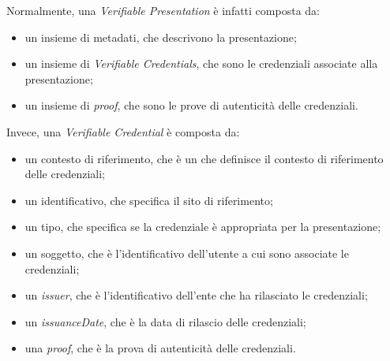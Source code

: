 Normalmente, una \textit{Verifiable Presentation} è infatti composta da:
\begin{itemize}
    \item un insieme di metadati, che descrivono la presentazione;
    \item un insieme di \textit{Verifiable Credentials}, che sono le credenziali associate alla presentazione;
    \item un insieme di \textit{proof}, che sono le prove di autenticità delle credenziali.
\end{itemize}

Invece, una \textit{Verifiable Credential} è composta da:
\begin{itemize}
    \item un contesto di riferimento, che è un  che definisce il contesto di riferimento delle credenziali;
    \item un identificativo, che specifica il sito di riferimento;
    \item un tipo, che specifica se la credenziale è appropriata per la presentazione;
    \item un soggetto, che è l'identificativo dell'utente a cui sono associate le credenziali;
    \item un \textit{issuer}, che è l'identificativo dell'ente che ha rilasciato le credenziali;
    \item un \textit{issuanceDate}, che è la data di rilascio delle credenziali;
    \item una \textit{proof}, che è la prova di autenticità delle credenziali.
\end{itemize}


